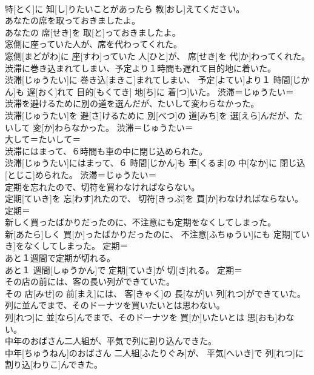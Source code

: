 \documentclass[8pt]{extreport}
\begin{document}
\begin{CJK}{UTF8}{min}
\\	特[とく]に 知[し]りたいことがあったら 教[おし]えてください。	
\\	あなたの席を取っておきましたよ。	
\\	あなたの 席[せき]を 取[と]っておきましたよ。	
\\	窓側に座っていた人が、席を代わってくれた。	
\\	窓側[まどがわ]に 座[すわ]っていた 人[ひと]が、 席[せき]を 代[か]わってくれた。	
\\	渋滞に巻き込まれてしまい、予定より１時間も遅れて目的地に着いた。	
\\	渋滞[じゅうたい]に 巻き込[まきこ]まれてしまい、 予定[よてい]より１ 時間[じかん]も 遅[おく]れて 目的[もくてき] 地[ち]に 着[つ]いた。	渋滞＝じゅうたい＝ 
\\	渋滞を避けるために別の道を選んだが、たいして変わらなかった。	
\\	渋滞[じゅうたい]を 避[さ]けるために 別[べつ]の 道[みち]を 選[えら]んだが、たいして 変[か]わらなかった。	渋滞＝じゅうたい＝ 
\\	大して＝たいして＝ 
\\	渋滞にはまって、６時間も車の中に閉じ込められた。	
\\	渋滞[じゅうたい]にはまって、６ 時間[じかん]も 車[くるま]の 中[なか]に 閉じ込[とじこ]められた。	渋滞＝じゅうたい＝ 
\\	定期を忘れたので、切符を買わなければならない。	
\\	定期[ていき]を 忘[わす]れたので、 切符[きっぷ]を 買[か]わなければならない。	定期＝ 
\\	新しく買ったばかりだったのに、不注意にも定期をなくしてしまった。	
\\	新[あたら]しく 買[か]ったばかりだったのに、 不注意[ふちゅうい]にも 定期[ていき]をなくしてしまった。	定期＝ 
\\	あと１週間で定期が切れる。	
\\	あと１ 週間[しゅうかん]で 定期[ていき]が 切[き]れる。	定期＝ 
\\	その店の前には、客の長い列ができていた。	
\\	その 店[みせ]の 前[まえ]には、 客[きゃく]の 長[なが]い 列[れつ]ができていた。	
\\	列に並んでまで、そのドーナツを買いたいとは思わない。	
\\	列[れつ]に 並[なら]んでまで、そのドーナツを 買[か]いたいとは 思[おも]わない。	
\\	中年のおばさん二人組が、平気で列に割り込んできた。	
\\	中年[ちゅうねん]のおばさん 二人組[ふたりぐみ]が、 平気[へいき]で 列[れつ]に 割り込[わりこ]んできた。	

\end{CJK}
\end{document}
